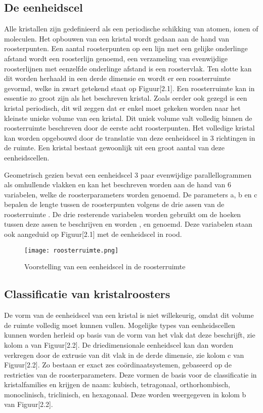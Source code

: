 \subsection{De eenheidscel}
Alle kristallen zijn gedefinieerd als een periodische schikking van atomen, ionen of moleculen. Het opbouwen van een kristal wordt gedaan aan de hand van roosterpunten. Een aantal roosterpunten op een lijn met een gelijke onderlinge afstand wordt een roosterlijn genoemd, een verzameling van evenwijdige roosterlijnen met eenzelfde onderlinge afstand is een roostervlak. Ten slotte kan dit worden herhaald in een derde dimensie en wordt er een roosterruimte gevormd, welke in zwart getekend staat op Figuur[2.1]. Een roosterruimte kan in essentie zo groot zijn als het beschreven kristal. Zoals eerder ook gezegd is een kristal periodisch, dit wil zeggen dat er enkel moet gekeken worden naar het kleinste unieke volume van een kristal. Dit uniek volume valt volledig binnen de roosterruimte beschreven door de eerste acht roosterpunten. Het volledige kristal kan worden opgebouwd door de translatie van deze eenheidscel in 3 richtingen in de ruimte. Een kristal bestaat gewoonlijk uit een groot aantal van deze eenheidscellen.
\par
Geometrisch gezien bevat een eenheidscel 3 paar evenwijdige parallellogrammen als omhullende vlakken en kan het beschreven worden aan de hand van 6 variabelen, welke de roosterparameters worden genoemd.  De parameters a, b en c bepalen de lengte tussen de roosterpunten volgens de drie assen van de roosterruimte . De drie resterende  variabelen worden gebruikt om de hoeken tussen deze assen te beschrijven en worden \textalpha, \textbeta{} en \textgamma{} genoemd. Deze variabelen staan ook aangeduid op Figuur[2.1] met de eenheidscel in rood. 

\begin{figure}
\texttt{[image: roosterruimte.png]}
\caption{Voorstelling van een eenheidscel in de roosterruimte \citep*{CRYS1}}
\end{figure}

\subsection{Classificatie van kristalroosters}
De vorm van de eenheidscel van een kristal is niet willekeurig, omdat dit volume de ruimte volledig moet kunnen vullen. Mogelijke types van eenheidscellen kunnen worden herleid op basis van de vorm van het vlak dat deze beschrijft, zie kolom a van Figuur[2.2]. De driedimensionale eenheidscel kan dan worden verkregen door de extrusie van dit vlak in de derde dimensie, zie kolom c van Figuur[2.2]. Zo bestaan er exact zes coördinaatsystemen, gebaseerd op de restricties van de roosterparameters. Deze vormen de basis voor de classificatie in kristalfamilies en krijgen de naam: kubisch, tetragonaal, orthorhombisch, monoclinisch, triclinisch, en hexagonaal. Deze worden weergegeven in kolom b van Figuur[2.2]. 

